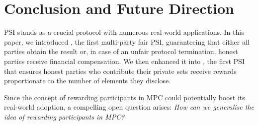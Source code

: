 
\vspace{-3.5mm}
\section{Conclusion and Future Direction}\label{sec::concl}
\vspace{-1mm}


PSI stands as a crucial protocol with numerous real-world applications. In this paper, we introduced \withFai, the first multi-party fair PSI, guaranteeing that either all parties obtain the result or, in case of an unfair protocol termination, honest parties receive financial compensation. We then enhanced it into \withRew, the first PSI that ensures honest parties who contribute their private sets receive rewards proportionate to the number of elements they disclose. 

Since the concept of rewarding participants in MPC could potentially boost its real-world adoption, a compelling open question arises: \textit{How can we generalise the idea of rewarding participants in MPC?}


